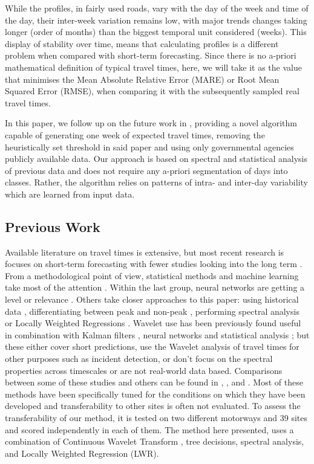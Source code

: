 \documentclass[a4paper, 10pt, conference]{ieeeconf}      %
\begin{document}
While the profiles, in fairly used roads, vary with the day of the week and time of the day, their inter-week variation remains low, with major trends changes taking longer (order of months) than the biggest temporal unit considered (weeks). 
This display of stability over time, means that calculating profiles is a different problem when compared with short-term forecasting.
Since there is no a-priori mathematical definition of typical travel times, here, we will take it as the value that minimises the Mean Absolute Relative Error (MARE) or Root Mean Squared Error (RMSE), when comparing it with the subsequently sampled real travel times.

In this paper, we follow up on the future work in \cite{ttprofiles}, providing a novel algorithm capable of generating one week of expected travel times, removing the heuristically set threshold in said paper and using only governmental agencies publicly available data.
Our approach is based on spectral and statistical analysis of previous data and does not require any a-priori segmentation of days into classes. 
Rather, the algorithm relies on patterns of intra- and inter-day variability which are learned from input data.
\subsection{Previous Work} \label{Previous Work}
Available literature on travel times is extensive, but most recent research is focuses on short-term forecasting with fewer studies looking into the long term \cite{long-term} \cite{long-term-2}. 
From a methodological point of view, statistical methods and machine learning take most of the attention \cite{should}. Within the last group, neural networks are getting a level or relevance \cite{NN} \cite{spectral2} .
Others take closer approaches to this paper: using historical data \cite{simple} \cite{dynamic-historic}, differentiating between peak and non-peak \cite{peak-historic}, performing spectral analysis \cite{spectral1} or Locally Weighted Regressions \cite{williams} \cite{sun} \cite{zhong} \cite{chowdhury} \cite{acqua} \cite{vana}.
Wavelet use has been previously found useful in combination with Kalman filters \cite{nonlinear}, neural networks \cite{samant} \cite{ghosh} \cite{hojjat} \cite{adeli} and statistical analysis \cite{basu} \cite{hang}; but these either cover short predictions, use the Wavelet analysis of travel times for other purposes such as incident detection, or don't focus on the spectral properties across timescales or are not real-world data based.
Comparisons between some of these studies and others can be found in \cite{nikovski}, \cite{lint}, \cite{mori} and \cite{ser}. 
Most of these methods have been specifically tuned for the conditions on which they have been developed and transferability to other sites is often not evaluated.
To assess the transferability of our method, it is tested on two different motorways and 39 sites and scored independently in each of them.
The method here presented, uses a combination of Continuous Wavelet Transform \cite{morletwavelet}, tree decisions, spectral analysis, and Locally Weighted Regression (LWR).
\end{document}
